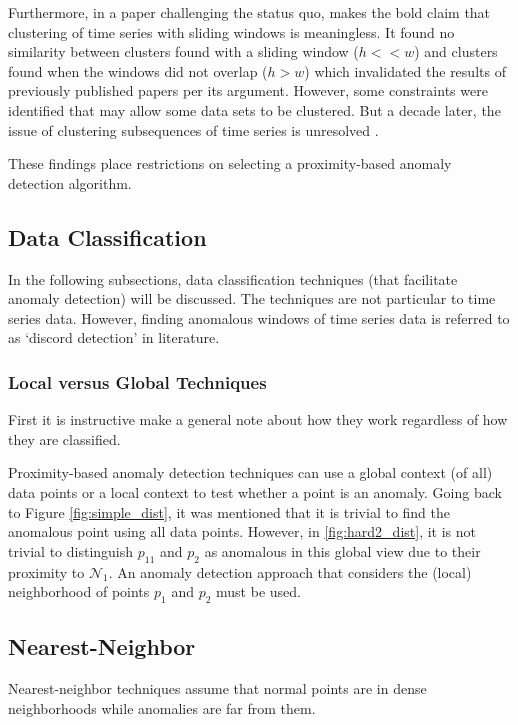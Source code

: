 Furthermore, in a paper challenging the status quo, \cite{Keogh2004} makes the bold claim that clustering of time series with sliding windows is meaningless. It found no similarity between clusters found with a sliding window ($h<<w$) and clusters found when the windows did not overlap ($h>w$) which invalidated the results of previously published papers per its argument. However, some constraints were identified that may allow some data sets to be clustered. But a decade later, the issue of clustering subsequences of time series is unresolved \cite{Zolhavarieh2014}.

These findings place restrictions on selecting a proximity-based anomaly detection algorithm.


\subsection{Data Classification}

In the following subsections, data classification techniques (that facilitate anomaly detection) will be discussed. The techniques are not particular to time series data. However, finding anomalous windows of time series data is referred to as `discord detection' in literature.

\subsubsection{Local versus Global Techniques}

First it is instructive make a general note about how they work regardless of how they are classified.

Proximity-based anomaly detection techniques can use a global context (of all) data points or a local context to test whether a point is an anomaly. Going back to Figure \ref{fig:simple_dist}, it was mentioned that it is trivial to find the anomalous point using all data points. However, in \ref{fig:hard2_dist}, it is not trivial to distinguish $p_11$ and $p_2$ as anomalous in this global view due to their proximity to $\mathcal{N}_1$. An anomaly detection approach that considers the (local) neighborhood of points $p_1$ and $p_2$ must be used.

\subsection{Nearest-Neighbor}

Nearest-neighbor techniques assume that normal points are in dense neighborhoods while anomalies are far from them.


